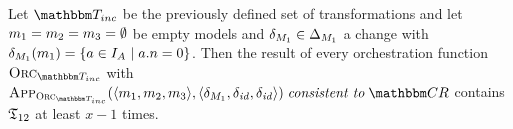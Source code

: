 \begin{lemma}
    \label{lemma:minimal_executions}
    Let $\transformationset{T}_{inc}$ be the previously defined set of transformations and let $m_{1} = m_{2} = m_{3} = \emptyset$ be empty models and $\delta_{M_{1}} \in \Delta_{M_{1}}$ a change with $\delta_{M_{1}}(m_{1}) = \{ a \in I_{A_{}} \mid a.n = 0 \}$.
    Then the result of every orchestration function $\orcfunction{\transformationset{T}_{inc}}$ with $\appfunction{\orcfunction{\transformationset{T}_{inc}}}(\tupled{\model{m}{1},\model{m}{2},\model{m}{3}},\tupled{\change{\metamodel{M}{1}},\identitychange,\identitychange}) \consistenttomath \consistencyrelationset{CR}$ contains $\mathfrak{T}_{12}$ at least $x-1$ times.
\end{lemma}
